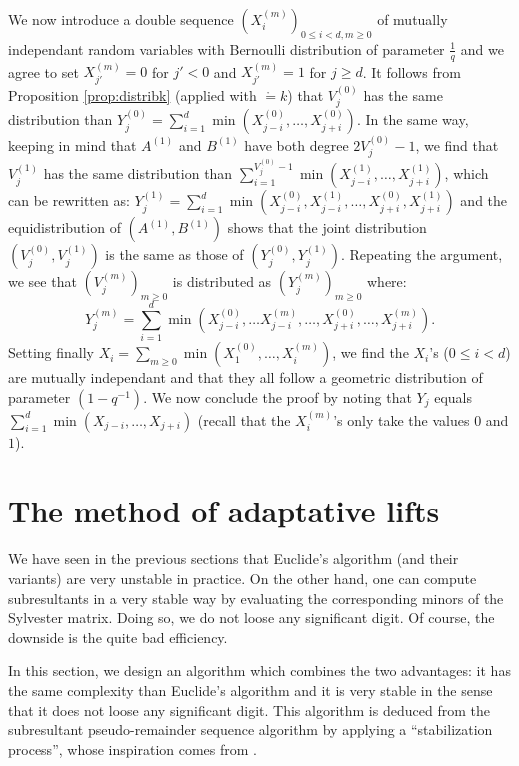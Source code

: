 \documentclass{sig-alternate}
\begin{document}
We now introduce a double sequence $(X_i^{(m)})_{0 \leq i < d, m 
\geq 0}$ of mutually independant random variables with Bernoulli
distribution of parameter $\frac 1 q$ and we agree to set 
$X_{j'}^{(m)} = 0$ for $j' < 0$ and $X_{j'}^{(m)} = 1$ for $j \geq d$.
It follows from Proposition \ref{prop:distribk} (applied with $\ring = 
k$) that $V_j^{(0)}$ has the same distribution than 
$Y_j^{(0)} = \sum_{i=1}^d \min(X_{j-i}^{(0)}, \ldots, X_{j+i}^{(0)})$.
In the same way, keeping in mind that $A^{(1)}$ and $B^{(1)}$ have both 
degree $2V_j^{(0)} - 1$, we find that $V_j^{(1)}$ has the same 
distribution than $\sum_{i=1}^{V_j^{(0)} - 1} \min(X_{j-i}^{(1)}, 
\ldots, X_{j+i}^{(1)})$, which can be rewritten as:
$Y_j^{(1)} = \sum_{i=1}^d \min(X_{j-i}^{(0)}, X_{j-i}^{(1)}, \ldots, 
X_{j+i}^{(0)}, X_{j+i}^{(1)})$
and the equidistribution of $(A^{(1)}, B^{(1)})$ shows that the 
joint distribution $(V_j^{(0)}, V_j^{(1)})$ is the same as those
of $(Y_j^{(0)}, Y_j^{(1)})$. Repeating the argument, we see that
$(V_j^{(m)})_{m \geq 0}$ is distributed as $(Y_j^{(m)})_{m \geq 0}$
where:
$$Y_j^{(m)} = \sum_{i=1}^d \min(X_{j-i}^{(0)}, \ldots X_{j-i}^{(m)}, 
\ldots, X_{j+i}^{(0)}, \ldots, X_{j+i}^{(m)}).$$
Setting finally $X_i = \sum_{m \geq 0} \min(X_1^{(0)}, \ldots, 
X_i^{(m)})$, we find the $X_i$'s ($0 \leq i < d$) are mutually 
independant and that they all follow a geometric distribution of 
parameter $(1 - q^{-1})$. We now conclude the proof by noting that 
$Y_j$ equals $\sum_{i=1}^d \min(X_{j-i}, \ldots, X_{j+i})$ (recall
that the $X_i^{(m)}$'s only take the values $0$ and $1$).

\section{The method of adaptative lifts}
\label{sec:stable}

We have seen in the previous sections that Euclide's algorithm (and 
their variants) are very unstable in practice. On the other hand, 
one can compute subresultants in a very stable way by evaluating
the corresponding minors of the Sylvester matrix. Doing so, we do
not loose any significant digit. Of course, the downside is the
quite bad efficiency.

In this section, we design an algorithm which combines the two
advantages: it has the same complexity than Euclide's algorithm
and it is very stable in the sense that it does not loose any
significant digit. 
This algorithm is deduced from the subresultant pseudo-remainder
sequence algorithm by applying a ``stabilization process'', whose 
inspiration comes from \cite{padicprec}.
\end{document}

